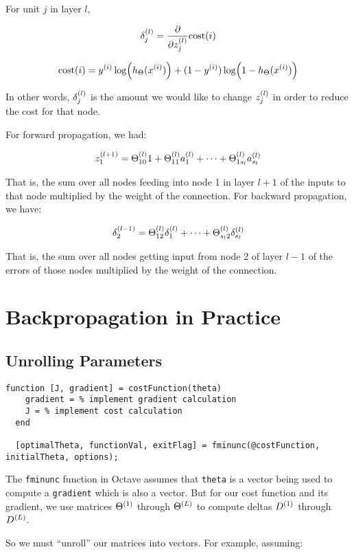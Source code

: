 For unit $j$ in layer $l$,

\[ \delta\ss{j}{l} = \pdv{z\ss{j}{l}} \mathrm{cost}(i) \]

\[ \mathrm{cost}(i) = y\s{i} \log(\hTh(x\s{i})) + (1 - y\s{i}) \log(1-\hTh(x\s{i})) \]

In other words, $\delta\ss{j}{l}$ is the amount we would like to change $z\ss{j}{l}$
in order to reduce the cost for that node.

For forward propagation, we had:

\[
    z\ss{1}{l+1} 
    = \Theta\ss{10}{l} 1
    + \Theta\ss{11}{l} a\ss{1}{l}
    + \dots
    + \Theta\ss{1 s_l}{l} a\ss{s_l}{l}
\]

That is, the sum over all nodes feeding into node 1 in layer $l+1$ of
the inputs to that node multiplied by the weight of the connection.
For backward propagation, we have:

\[
    \delta\ss{2}{l-1}
    = \Theta\ss{12}{l} \delta\ss{1}{l}
    + \dots
    + \Theta\ss{s_l2}{l} \delta\ss{s_l}{l}
\]

That is, the sum over all nodes getting input from node 2 of layer $l-1$ of
the errors of those nodes multiplied by the weight of the connection.

\section{Backpropagation in Practice}

\subsection{Unrolling Parameters}

\begin{lstlisting}[style=Matlab-editor]
  function [J, gradient] = costFunction(theta)
    gradient = % implement gradient calculation
    J = % implement cost calculation
  end
  
  [optimalTheta, functionVal, exitFlag] = fminunc(@costFunction, initialTheta, options);
\end{lstlisting}

The \texttt{fminunc} function in Octave assumes that \texttt{theta} is a vector
being used to compute a \texttt{gradient} which is also a vector.
But for our cost function and its gradient,
we use matrices $\Theta\s{1}$ through $\Theta\s{L}$
to compute deltas $D\s{1}$ through $D\s{L}$.

So we must ``unroll'' our matrices into vectors.
For example, assuming:

